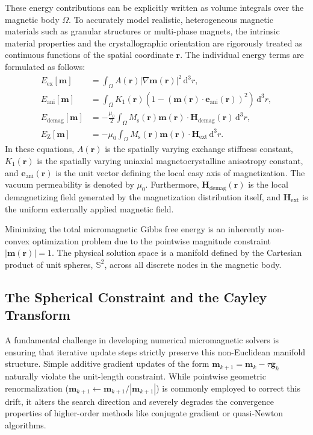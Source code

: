 \documentclass[10pt, a4paper, twocolumn]{article}
\begin{document}
These energy contributions can be explicitly written as volume integrals over the magnetic body $\Omega$. To accurately model realistic, heterogeneous magnetic materials such as granular structures or multi-phase magnets, the intrinsic material properties and the crystallographic orientation are rigorously treated as continuous functions of the spatial coordinate $\mathbf{r}$. The individual energy terms are formulated as follows:
\begin{align}
    E_{\mathrm{ex}}[\mathbf{m}] &= \int_{\Omega} A(\mathbf{r}) \left| \nabla \mathbf{m}(\mathbf{r}) \right|^2 \, \mathrm{d}^3 r, \\
    E_{\mathrm{ani}}[\mathbf{m}] &= \int_{\Omega} K_1(\mathbf{r}) \left( 1 - \left( \mathbf{m}(\mathbf{r}) \cdot \mathbf{e}_{\mathrm{ani}}(\mathbf{r}) \right)^2 \right) \, \mathrm{d}^3 r, \\
    E_{\mathrm{demag}}[\mathbf{m}] &= -\frac{\mu_0}{2} \int_{\Omega} M_\mathrm{s}(\mathbf{r}) \mathbf{m}(\mathbf{r}) \cdot \mathbf{H}_{\mathrm{demag}}(\mathbf{r}) \, \mathrm{d}^3 r, \\
    E_{\mathrm{Z}}[\mathbf{m}] &= -\mu_0 \int_{\Omega} M_\mathrm{s}(\mathbf{r}) \mathbf{m}(\mathbf{r}) \cdot \mathbf{H}_{\mathrm{ext}} \, \mathrm{d}^3 r.
\end{align}
In these equations, $A(\mathbf{r})$ is the spatially varying exchange stiffness constant, $K_1(\mathbf{r})$ is the spatially varying uniaxial magnetocrystalline anisotropy constant, and $\mathbf{e}_{\mathrm{ani}}(\mathbf{r})$ is the unit vector defining the local easy axis of magnetization. The vacuum permeability is denoted by $\mu_0$. Furthermore, $\mathbf{H}_{\mathrm{demag}}(\mathbf{r})$ is the local demagnetizing field generated by the magnetization distribution itself, and $\mathbf{H}_{\mathrm{ext}}$ is the uniform externally applied magnetic field.

Minimizing the total micromagnetic Gibbs free energy is an inherently non-convex optimization problem due to the pointwise magnitude constraint $|\mathbf{m}(\mathbf{r})| = 1$. The physical solution space is a manifold defined by the Cartesian product of unit spheres, $\mathbb{S}^2$, across all discrete nodes in the magnetic body.

\subsection{The Spherical Constraint and the Cayley Transform}
A fundamental challenge in developing numerical micromagnetic solvers is ensuring that iterative update steps strictly preserve this non-Euclidean manifold structure. Simple additive gradient updates of the form $\mathbf{m}_{k+1} = \mathbf{m}_k - \tau \mathbf{g}_k$ naturally violate the unit-length constraint. While pointwise geometric renormalization ($\mathbf{m}_{k+1} \leftarrow \mathbf{m}_{k+1}/|\mathbf{m}_{k+1}|$) is commonly employed to correct this drift, it alters the search direction and severely degrades the convergence properties of higher-order methods like conjugate gradient or quasi-Newton algorithms.
\end{document}
